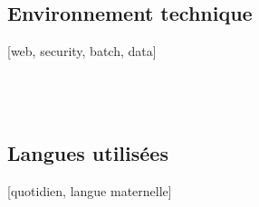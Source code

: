 {    \subsection{Environnement technique}
     [web, security, batch, data]\\
     \\
         \\
      \\

    \subsection{Langues utilisées}
    [quotidien, langue maternelle]
}
\makebody
\clearpage
